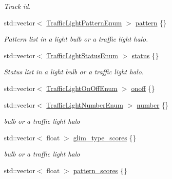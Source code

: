 \begin{DoxyCompactItemize}
\begin{DoxyCompactList}\small\item\em Track id. \end{DoxyCompactList}\item 
std\+::vector$<$ \hyperlink{structmaf__perception__interface_1_1TrafficLightPatternEnum}{Traffic\+Light\+Pattern\+Enum} $>$ \hyperlink{structmaf__perception__interface_1_1PhysicalTrafficLightBulb_a89bfa225d60df9fd1d9568794573aec4}{pattern} \{\}
\begin{DoxyCompactList}\small\item\em Pattern list in a light bulb or a traffic light halo. \end{DoxyCompactList}\item 
std\+::vector$<$ \hyperlink{structmaf__perception__interface_1_1TrafficLightStatusEnum}{Traffic\+Light\+Status\+Enum} $>$ \hyperlink{structmaf__perception__interface_1_1PhysicalTrafficLightBulb_a843b01368e1645bedf68129752d1350e}{status} \{\}
\begin{DoxyCompactList}\small\item\em Status list in a light bulb or a traffic light halo. \end{DoxyCompactList}\item 
std\+::vector$<$ \hyperlink{structmaf__perception__interface_1_1TrafficLightOnOffEnum}{Traffic\+Light\+On\+Off\+Enum} $>$ \hyperlink{structmaf__perception__interface_1_1PhysicalTrafficLightBulb_aeeadaca13b0892d267f1a63f26b5e718}{onoff} \{\}
\item 
std\+::vector$<$ \hyperlink{structmaf__perception__interface_1_1TrafficLightNumberEnum}{Traffic\+Light\+Number\+Enum} $>$ \hyperlink{structmaf__perception__interface_1_1PhysicalTrafficLightBulb_a72799c8cb76211dfe6163f57b2d03ce7}{number} \{\}
\begin{DoxyCompactList}\small\item\em bulb or a traffic light halo \end{DoxyCompactList}\item 
std\+::vector$<$ float $>$ \hyperlink{structmaf__perception__interface_1_1PhysicalTrafficLightBulb_a4b90fdea9f96d4c78995668fa8e33475}{glim\+\_\+type\+\_\+scores} \{\}
\begin{DoxyCompactList}\small\item\em bulb or a traffic light halo \end{DoxyCompactList}\item 
std\+::vector$<$ float $>$ \hyperlink{structmaf__perception__interface_1_1PhysicalTrafficLightBulb_a4b2971e430c00fc940faa50a278bef68}{pattern\+\_\+scores} \{\}

\end{DoxyCompactItemize}
